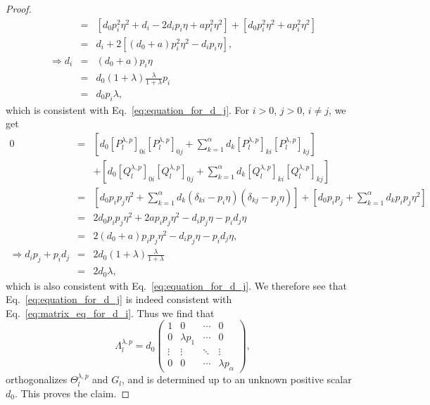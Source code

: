 \documentclass{article}
\numberwithin{myclaim}{section}
\newcommand{\eq}[1]{Eq.\ \ref{#1}}
\begin{document}
\begin{proof}
\begin{eqnarray}
     &=& \left[ d_0 p_i^2 \eta^2 + d_i - 2 d_i p_i \eta + a p_i^2 \eta^2 \right] + \left[ d_0 p_i^2 \eta^2 + a p_i^2 \eta^2 \right] \\
     &=& d_i + 2 [ (d_0+a) p_i^2 \eta^2 - d_i p_i \eta], \\
     \Rightarrow d_i &=& (d_0 + a) p_i \eta \\
     &=& d_0 (1+\lambda)\frac{\lambda}{1+\lambda} p_i \\
     &=& d_0 p_i \lambda,
\end{eqnarray}
which is consistent with \eq{eq:equation_for_d_j}. For $i > 0$, $j > 0$, $i \neq j$, we get
\begin{eqnarray}
    0 &=& \left[ d_0 [P_l^{\lambda,p}]_{0i}[P_l^{\lambda,p}]_{0j} + \sum_{k=1}^\alpha d_k [P_l^{\lambda,p}]_{ki}[P_l^{\lambda,p}]_{kj} \right] \nonumber \\
    & & + \left[ d_0 [Q_l^{\lambda,p}]_{0i}[Q_l^{\lambda,p}]_{0j} + \sum_{k=1}^\alpha d_k [Q_l^{\lambda,p}]_{ki} [Q_l^{\lambda,p}]_{kj}\right] \\
    &=& \left[ d_0 p_i p_j \eta^2 + \sum_{k=1}^\alpha d_k (\delta_{ki} - p_i \eta)(\delta_{kj} - p_j\eta ) \right] + \left[ d_0 p_i p_j + \sum_{k=1}^\alpha d_k p_i p_j \eta^2 \right] \\
    &=& 2 d_0 p_i p_j \eta^2 + 2 a p_i p_j \eta^2 - d_i p_j \eta - p_i d_j \eta \\
    &=& 2(d_0 + a) p_i p_j \eta^2 - d_i p_j \eta - p_i d_j \eta, \\
    \Rightarrow d_i p_j + p_i d_j &=& 2 d_0 (1 + \lambda) \frac{\lambda}{1 + \lambda} \\
    &=& 2 d_0 \lambda,
\end{eqnarray}
which is also consistent with \eq{eq:equation_for_d_j}. We therefore see that \eq{eq:equation_for_d_j} is indeed consistent with \eq{eq:matrix_eq_for_d_i}. Thus we find that 
\begin{equation}
    \Lambda_l^{\lambda,p} =
    d_0 \left( 
    \begin{array}{cccc} 
        1 & 0 &\cdots & 0 \\
        0 & \lambda p_1 & \cdots &  0  \\
        \vdots & \vdots & \ddots & \vdots \\
        0 & 0 & \cdots & \lambda p_\alpha  
    \end{array} \right), \label{eq:def_of_Lambda_l}
\end{equation}
orthogonalizes $\Theta_l^{\lambda,p}$ and $G_l$, and is determined up to an unknown positive scalar $d_0$. This proves the claim.
\end{proof}
\end{document}
